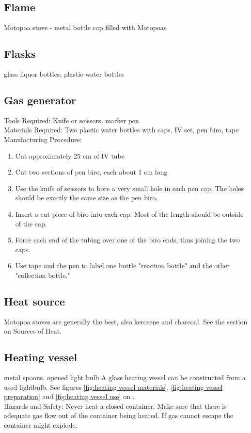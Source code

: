 \subsection*{Flame}
Motopoa stove - metal bottle cap filled with Motopoas

\subsection*{Flasks}
glass liquor bottles, plastic water bottles

\subsection*{Gas generator}
Tools Required: Knife or scissors, marker pen\\
Materials Required: Two plastic water bottles with caps, IV set, pen biro, tape\\
Manufacturing Procedure:
\begin{enumerate}
\item{Cut approximately 25 cm of IV tube}
\item{Cut two sections of pen biro, each about 1 cm long}
\item{Use the knife of scissors to bore a very small hole in each pen cap. The holes should be exactly the same size as the pen biro.}
\item{Insert a cut piece of biro into each cap. Most of the length should be outside of the cap.}
\item{Force each end of the tubing over one of the biro ends, thus joining the two caps.}
\item{Use tape and the pen to label one bottle "reaction bottle" and the other "collection bottle."}
\end{enumerate}

\subsection*{Heat source}
Motopoa stoves are generally the best, also kerosene and charcoal. See the section on Sources of Heat.

\subsection*{Heating vessel}
metal spoons, opened light bulb
A glass heating vessel can be constructed from a used lightbulb. See figures \ref{fig:heating vessel materials}, \ref{fig:heating vessel preparation} and \ref{fig:heating vessel use} on \pageref{fig:heating vessel use}.\\
Hazards and Safety: Never heat a closed container. Make sure that there is adequate gas flow out of the container being heated. If gas cannot escape the container might explode.

